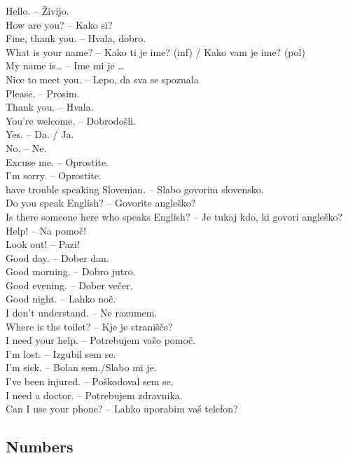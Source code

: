 Hello. -- Živijo.\\
How are you? -- Kako si?\\
Fine, thank you. -- Hvala, dobro.\\
What is your name? -- Kako ti je ime? (inf) / Kako vam je ime? (pol)\\
My name is\ldots{} -- Ime mi je \ldots{}\\
Nice to meet you. -- Lepo, da sva se spoznala\\
Please. -- Prosim.\\
Thank you. -- Hvala.\\
You're welcome. -- Dobrodošli.\\
Yes. -- Da. / Ja.\\
No. -- Ne.\\
Excuse me.  -- Oprostite.\\
I'm sorry. -- Oprostite.\\
have trouble speaking Slovenian. -- Slabo govorim slovensko.\\
Do you speak English? -- Govorite angleško?\\
Is there someone here who speaks English?  -- Je tukaj kdo, ki govori angleško?\\
Help! -- Na pomoč!\\
Look out! -- Pazi!\\
Good day. -- Dober dan.\\
Good morning. -- Dobro jutro.\\
Good evening. -- Dober večer.\\
Good night. -- Lahko noč.\\
I don't understand.  -- Ne razumem.\\
Where is the toilet? -- Kje je stranišče?\\
I need your help. -- Potrebujem vašo pomoč.\\
I'm lost. -- Izgubil sem se.\\
I'm sick. -- Bolan sem./Slabo mi je.\\
I've been injured.  -- Poškodoval sem se.\\
I need a doctor. -- Potrebujem zdravnika.\\
Can I use your phone? -- Lahko uporabim vaš telefon?\\


\subsection{Numbers}


